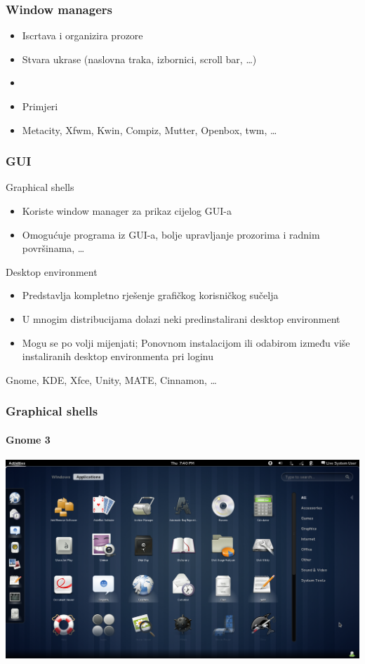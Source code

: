 \documentclass[t,table,usenames,dvipsnames]{beamer}
\begin{document}
\begin{frame}
	\frametitle{Window managers}
	\begin{itemize}
		\item Iscrtava i organizira prozore
		\item Stvara ukrase (naslovna traka, izbornici, scroll bar, \ldots)
		\item[]
		\item[] Primjeri
		\item[] Metacity, Xfwm, Kwin, Compiz, Mutter, Openbox, twm, \ldots
	\end{itemize}
\end{frame}


\begin{frame}
	\frametitle{GUI}
	Graphical shells
	\begin{itemize}
		\item Koriste window manager za prikaz cijelog GUI-a
		\item Omogućuje programa iz GUI-a, bolje upravljanje prozorima i radnim površinama, \ldots
	\end{itemize}
	Desktop environment
	\begin{itemize}
		\item Predstavlja kompletno rješenje grafičkog korisničkog sučelja
		\item U mnogim distribucijama dolazi neki predinstalirani desktop environment
		\item Mogu se po volji mijenjati; Ponovnom instalacijom ili odabirom između više instaliranih desktop environmenta pri loginu
	\end{itemize}
	
	Gnome, KDE, Xfce, Unity, MATE, Cinnamon, \ldots

\end{frame}


\begin{frame}
	\frametitle{Graphical shells}
	\framesubtitle{Gnome 3}
	\includegraphics[width=\textwidth]{gnome3.png}
\end{frame}
\end{document}
